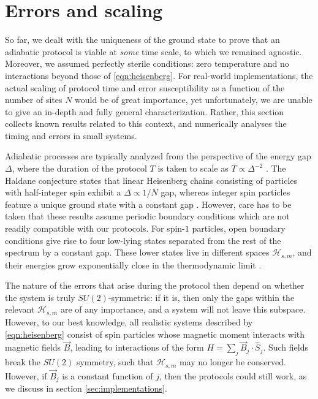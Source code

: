 \section{Errors and scaling}
\label{sec:errors}
So far, we dealt with the uniqueness of the ground state to prove that an adiabatic protocol is viable at \emph{some} time scale, to which we remained agnostic. Moreover, we assumed perfectly sterile conditions: zero temperature and no interactions beyond those of \cref{eqn:heisenberg}. For real-world implementations, the actual scaling of protocol time and error susceptibility as a function of the number of sites $N$ would be of great importance, yet unfortunately, we are unable to give an in-depth and fully general characterization. Rather, this section collects known results related to this context, and numerically analyses the timing and errors in small systems.

Adiabatic processes are typically analyzed from the perspective of the energy gap $\Delta$, where the duration of the protocol $T$ is taken to scale as $T \propto \Delta^{-2}$ \cite{Childs2001}. The Haldane conjecture states that linear Heisenberg chains consisting of particles with half-integer spin exhibit a $\Delta \propto 1/N$ gap, whereas integer spin particles feature a unique ground state with a constant gap \cite{Affleck1986}. However, care has to be taken that these results assume periodic boundary conditions which are not readily compatible with our protocols. For spin-$1$ particles, open boundary conditions give rise to four low-lying states separated from the rest of the spectrum by a constant gap. These lower states live in different spaces $\mathcal{H}_{s,m}$, and their energies grow exponentially close in the thermodynamic limit \cite{Kennedy1990}.

The nature of the errors that arise during the protocol then depend on whether the system is truly $SU(2)$-symmetric: if it is, then only the gaps within the relevant $\mathcal{H}_{s,m}$ are of any importance, and a system will not leave this subspace. However, to our best knowledge, all realistic systems described by \cref{eqn:heisenberg} consist of spin particles whose magnetic moment interacts with magnetic fields $\vec{B}$, leading to interactions of the form $H = \sum_j \vec{B}_j \cdot \hat{S}_j$. Such fields break the $SU(2)$ symmetry, such that $\mathcal{H}_{s,m}$ may no longer be conserved. However, if $\vec{B}_j$ is a constant function of $j$, then the protocols could still work, as we discuss in section \ref{sec:implementations}. 

